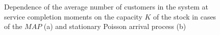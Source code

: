 \documentclass[12pt, a4paper]{article}
\begin{document}
\begin{figure}[h]
\begin{minipage}[h]{0.49\linewidth}
\end{minipage}
\caption{Dependence of the average number of customers in the system at service completion moments on the capacity $K$ of the stock
in cases of the $MAP$ (a) and stationary Poisson arrival process (b)}
\end{figure}

\begin{figure}[h]
\begin{minipage}[h]{0.49\linewidth}
\end{minipage}
\hfill
\begin{minipage}[h]{0.49\linewidth}

\end{minipage}
\end{figure}
\end{document}
